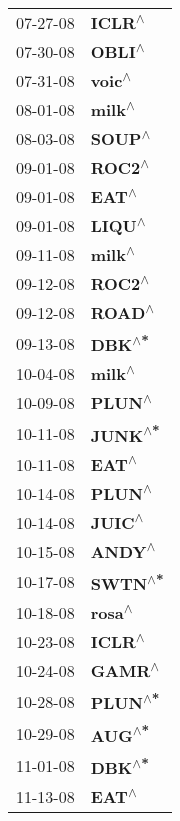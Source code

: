 \begin{supertabular}{p{0.08\textwidth}p{0.2\textwidth}}
 07-27-08 &    \textbf{ICLR\textsuperscript{$\wedge$}} \\
 07-30-08 &    \textbf{OBLI\textsuperscript{$\wedge$}} \\
 07-31-08 &    \textbf{voic\textsuperscript{$\wedge$}} \\
 08-01-08 &    \textbf{milk\textsuperscript{$\wedge$}} \\
 08-03-08 &    \textbf{SOUP\textsuperscript{$\wedge$}} \\
 09-01-08 &    \textbf{ROC2\textsuperscript{$\wedge$}} \\
 09-01-08 &     \textbf{EAT\textsuperscript{$\wedge$}} \\
 09-01-08 &    \textbf{LIQU\textsuperscript{$\wedge$}} \\
 09-11-08 &    \textbf{milk\textsuperscript{$\wedge$}} \\
 09-12-08 &    \textbf{ROC2\textsuperscript{$\wedge$}} \\
 09-12-08 &    \textbf{ROAD\textsuperscript{$\wedge$}} \\
 09-13-08 &    \textbf{DBK\textsuperscript{$\wedge$*}} \\
 10-04-08 &    \textbf{milk\textsuperscript{$\wedge$}} \\
 10-09-08 &    \textbf{PLUN\textsuperscript{$\wedge$}} \\
 10-11-08 &   \textbf{JUNK\textsuperscript{$\wedge$*}} \\
 10-11-08 &     \textbf{EAT\textsuperscript{$\wedge$}} \\
 10-14-08 &    \textbf{PLUN\textsuperscript{$\wedge$}} \\
 10-14-08 &    \textbf{JUIC\textsuperscript{$\wedge$}} \\
 10-15-08 &    \textbf{ANDY\textsuperscript{$\wedge$}} \\
 10-17-08 &   \textbf{SWTN\textsuperscript{$\wedge$*}} \\
 10-18-08 &    \textbf{rosa\textsuperscript{$\wedge$}} \\
 10-23-08 &    \textbf{ICLR\textsuperscript{$\wedge$}} \\
 10-24-08 &    \textbf{GAMR\textsuperscript{$\wedge$}} \\
 10-28-08 &   \textbf{PLUN\textsuperscript{$\wedge$*}} \\
 10-29-08 &    \textbf{AUG\textsuperscript{$\wedge$*}} \\
 11-01-08 &    \textbf{DBK\textsuperscript{$\wedge$*}} \\
 11-13-08 &     \textbf{EAT\textsuperscript{$\wedge$}} \\

\end{supertabular}
